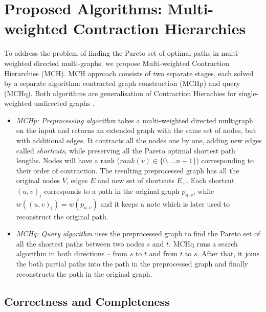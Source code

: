 
\section{Proposed Algorithms: Multi-weighted Contraction Hierarchies}
\label{secAlgorithms}

To address the problem of finding the Pareto set of optimal paths in multi-weighted directed multi-graphs, we propose Multi-weighted Contraction Hierarchies (MCH). 
MCH approach consists of two separate stages, each solved by a separate algorithm: contracted graph construction (MCHp) and query (MCHq). 
Both algorithms are generalisation of Contraction Hierachies for single-weighted undirected graphs \cite{geisberger2008contraction}.

\begin{itemize}
  \item {\em MCHp: Preprocessing algorithm} takes a multi-weighted directed multigraph on the input and returns an extended graph with the same set of nodes, but with additional edges. It contracts all the nodes one by one, adding new edges called \emph{shortcuts}, while preserving all the Pareto optimal shortest path lengths. 
Nodes will have a rank ($rank(v) \in \{0, \dots n-1\}$) corresponding to their order of contraction.
The resulting preprocessed graph has all the original nodes $V$, edges $E$ and new set of shortcuts $E_+$.
Each shortcut $(u,v)_i$ corresponds to a path in the original graph $p_{u,v}$, while $w((u,v)_i) = w(p_{u,v})$ and it keeps a note which is later used to reconstruct the original path.
  \item {\em MCHq: Query algorithm} uses the preprocessed graph to find the Pareto set of all
the shortest paths between two nodes $s$ and $t$. MCHq runs a search algorithm in both directions -- from $s$ to $t$ and from $t$ to $s$. After that, it joins the both partial paths into the path in the preprocessed graph and finally reconstructs the path in the original graph. 
\end{itemize}





\subsection{Correctness and Completeness}
\label{secFormalResults}

